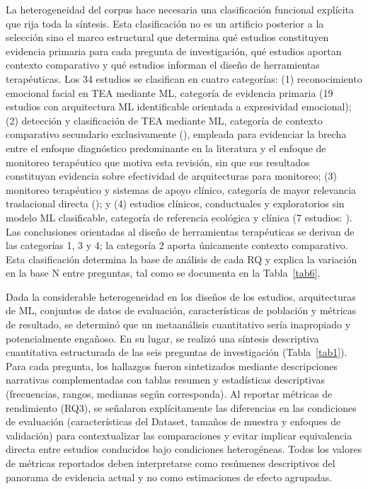 \documentclass[ASNA,twocolumn]{USG}
\begin{document}
	La heterogeneidad del corpus hace necesaria una clasificación funcional explícita
	que rija toda la síntesis. Esta clasificación no es un artificio posterior a la
	selección sino el marco estructural que determina qué estudios constituyen evidencia primaria para cada pregunta de investigación, qué estudios aportan
	contexto comparativo y qué estudios informan el diseño de herramientas
	terapéuticas. Los 34 estudios se clasifican en cuatro categorías: (1)
	reconocimiento emocional facial en TEA mediante ML, categoría de evidencia
	primaria (19 estudios con arquitectura ML identificable orientada a expresividad
	emocional); (2) detección y clasificación de TEA mediante ML, categoría de
	contexto comparativo secundario exclusivamente (\cite{Ahmad2024,Alsubai2025}),
	empleada para evidenciar la brecha entre el enfoque diagnóstico predominante en
	la literatura y el enfoque de monitoreo terapéutico que motiva esta revisión, sin
	que sus resultados constituyan evidencia sobre efectividad de arquitecturas para
	monitoreo; (3) monitoreo terapéutico y sistemas de apoyo clínico, categoría de
	mayor relevancia traslacional directa (\cite{Hassan2025,Rudovic2018,Rudovic2019});
	y (4) estudios clínicos, conductuales y exploratorios sin modelo ML clasificable,
	categoría de referencia ecológica y clínica (7 estudios:
	\cite{He2019,Reed2021,Lecciso2021,Almeida2019,Nagae2022,Papaioannou2021,Xu2023}).
	Las conclusiones orientadas al diseño de herramientas terapéuticas se derivan de
	las categorías 1, 3 y 4; la categoría 2 aporta únicamente contexto comparativo.
	Esta clasificación determina la base de análisis de cada RQ y explica la variación
	en la base N entre preguntas, tal como se documenta en la Tabla~\ref{tab6}.
	
	Dada la considerable heterogeneidad en los diseños de los estudios, arquitecturas
	de ML, conjuntos de datos de evaluación, características de población y métricas
	de resultado, se determinó que un metaanálisis cuantitativo sería inapropiado y
	potencialmente engañoso. En su lugar, se realizó una síntesis descriptiva
	cuantitativa estructurada de las seis preguntas de investigación
	(Tabla~\ref{tab1}). Para cada pregunta, los hallazgos fueron sintetizados mediante
	descripciones narrativas complementadas con tablas resumen y estadísticas
	descriptivas (frecuencias, rangos, medianas según corresponda). Al reportar
	métricas de rendimiento (RQ3), se señalaron explícitamente las diferencias en las
	condiciones de evaluación (características del Dataset, tamaños de muestra y
	enfoques de validación) para contextualizar las comparaciones y evitar implicar
	equivalencia directa entre estudios conducidos bajo condiciones heterogéneas.
	Todos los valores de métricas reportados deben interpretarse como resúmenes
	descriptivos del panorama de evidencia actual y no como estimaciones de efecto
	agrupadas.
	
\end{document}
